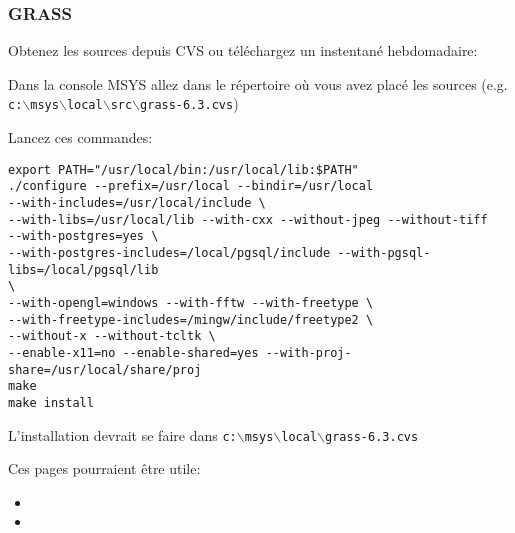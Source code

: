 \subsubsection{GRASS}
Obtenez les sources depuis CVS ou t\'el\'echargez un instentan\'e hebdomadaire:

 \begin{quotation}
 \end{quotation}

Dans la console MSYS allez dans le r\'epertoire o\`u vous avez plac\'e les sources (e.g. \texttt{c:$\backslash$msys$\backslash$local$\backslash$src$\backslash$grass-6.3.cvs})

Lancez ces commandes:

\begin{verbatim}
export PATH="/usr/local/bin:/usr/local/lib:$PATH"
./configure --prefix=/usr/local --bindir=/usr/local
--with-includes=/usr/local/include \
--with-libs=/usr/local/lib --with-cxx --without-jpeg --without-tiff
--with-postgres=yes \
--with-postgres-includes=/local/pgsql/include --with-pgsql-libs=/local/pgsql/lib
\
--with-opengl=windows --with-fftw --with-freetype \
--with-freetype-includes=/mingw/include/freetype2 \
--without-x --without-tcltk \
--enable-x11=no --enable-shared=yes --with-proj-share=/usr/local/share/proj
make
make install
\end{verbatim}

% 

L'installation devrait se faire dans \texttt{c:$\backslash$msys$\backslash$local$\backslash$grass-6.3.cvs}

Ces pages pourraient \^etre utile:

\begin{itemize}
\item
{}
\item
{}
\end{itemize}

